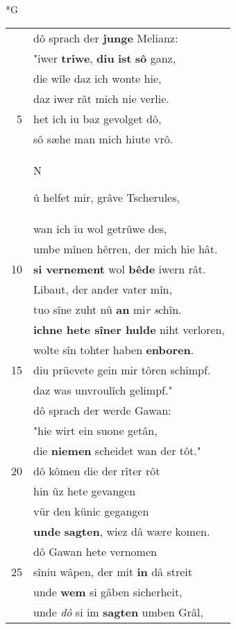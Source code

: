 \documentclass[8pt,a4paper,notitlepage]{article}
\begin{document}
\begin{table}[ht]
\begin{minipage}[t]{0.5\linewidth}
\small
\begin{center}*G
\end{center}
\begin{tabular}{rl}
 & dô sprach der \textbf{junge} Melianz:\\ 
 & "iwer \textbf{triwe}, \textbf{diu} \textbf{ist} \textbf{sô} ganz,\\ 
 & die wîle daz ich wonte hie,\\ 
 & daz iwer rât mich nie verlie.\\ 
5 & het ich iu baz gevolget dô,\\ 
 & sô sæhe man mich hiute vrô.\\ 
 & \begin{large}N\end{large}û helfet mir, grâve Tscherules,\\ 
 & wan ich iu wol getrûwe des,\\ 
 & umbe mînen hêrren, der mich hie hât.\\ 
10 & \textbf{si vernement} wol \textbf{bêde} iwern rât.\\ 
 & Libaut, der ander vater mîn,\\ 
 & tuo sîne zuht nû \textbf{an} mi\textit{r} \textit{s}chîn.\\ 
 & \textbf{ichne hete sîner hulde} niht verloren,\\ 
 & wolte sîn tohter haben \textbf{enboren}.\\ 
15 & diu prüevete gein mir tôren schimpf.\\ 
 & daz was unvroulîch gelimpf."\\ 
 & dô sprach der werde Gawan:\\ 
 & "hie wirt ein suone getân,\\ 
 & die \textbf{niemen} scheidet wan der tôt."\\ 
20 & dô kômen die der rîter rôt\\ 
 & hin ûz hete gevangen\\ 
 & vür den künic gegangen\\ 
 & \textbf{unde} \textbf{sagten}, wiez dâ wære komen.\\ 
 & dô Gawan hete vernomen\\ 
25 & sîniu wâpen, der mit \textbf{in} dâ streit\\ 
 & unde \textbf{wem} si gâben sicherheit,\\ 
 & unde \textit{dô} si im \textbf{sagten} umben Grâl,\\ 

\end{tabular}
\end{minipage}
\end{table}
\end{document}
